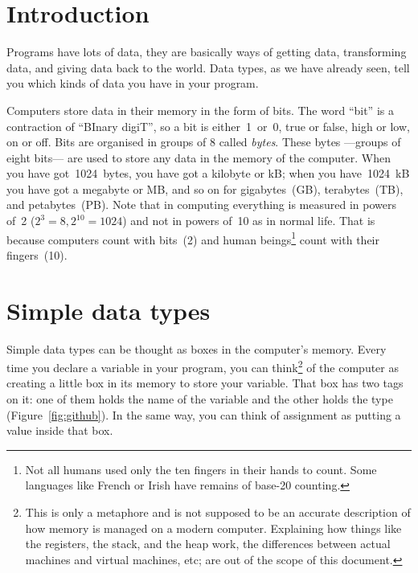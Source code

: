 


%
%
%

\section{Introduction}
\label{sec:introduction}

Programs have lots of data, they are basically
ways of getting data, transforming data, and giving data back to the
world. 
%
Data types, as we have already seen, tell you which kinds of data you
have in your program. 

Computers store data in their memory in the form of bits. The word
``bit'' is a contraction of ``BInary digiT'', so a bit is
either~1~or~0, true or false, high or low, on or off. Bits are
organised in groups of 8 called \emph{bytes}. These bytes ---groups of
eight bits--- are used to store any data in the memory of the
computer. When you have got~1024~bytes, you have got a kilobyte or kB;
when you have~1024~kB you have got a megabyte or MB, and so on for
gigabytes~(GB), terabytes~(TB), and petabytes~(PB). Note that in
computing everything is measured in powers of~2 ($2^3 = 8, 2^{10} =
1024$) and not in powers of~10 as in normal life. That is because
computers count with bits~(2) and human beings\footnote{Not all humans
used only the ten fingers in their hands to count. Some languages like
French or Irish have remains of base-20 counting.} count with their
fingers~(10). 

\section{Simple data types}
\label{sec:simple-data-types}

Simple data types can be thought as boxes in the computer's
memory. Every time you declare a variable in your program, you can
think\footnote{This is only a metaphore and is not supposed to be an
  accurate description of how memory is managed on a modern
  computer. Explaining how things like the registers, the stack, and
  the heap work, the differences between actual machines and virtual
  machines, etc; are out of the scope of this document.} of the
computer as creating a little box in its memory to store your
variable. That box has two tags on it: one of them holds the name of
the variable and the other holds the type
(Figure~\ref{fig:github}). In the same way, you can think of
assignment as putting a value inside that box. 

